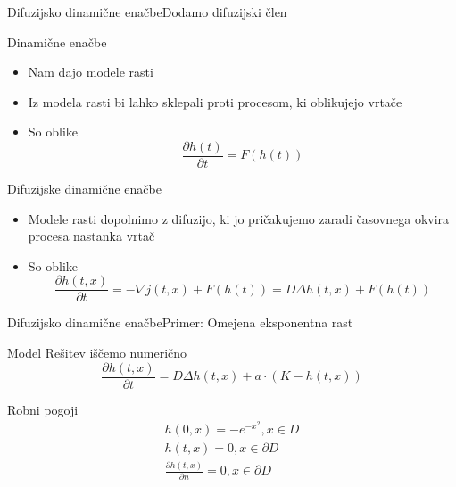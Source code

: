 \documentclass{beamer}
\begin{document}
\begin{frame}{Difuzijsko dinamične enačbe}{Dodamo difuzijski člen}

\begin{block}{Dinamične enačbe}
  \begin{itemize}
  \item
    Nam dajo modele rasti
  \item
    Iz modela rasti bi lahko sklepali proti procesom, ki oblikujejo vrtače
  \item
    So oblike \begin{equation} \frac{\partial h(t)}{\partial t} = F( h(t) ) \end{equation}
  \end{itemize}
\end{block}
\begin{block}{Difuzijske dinamične enačbe}
  \begin{itemize}
  \item
    Modele rasti dopolnimo z difuzijo, ki jo pričakujemo zaradi časovnega okvira procesa nastanka vrtač
  \item
    So oblike \begin{equation}  \frac{ \partial h(t,x) }{ \partial t} = - \nabla j(t,x) + F( h(t) )= D \Delta h(t,x) + F( h(t) ) \end{equation}
  \end{itemize}
\end{block}
\end{frame}


\begin{frame}{Difuzijsko dinamične enačbe}{Primer: Omejena eksponentna rast}
\begin{block}{Model}
  Rešitev iščemo numerično
  \begin{equation} \frac{ \partial h(t,x) }{ \partial t} = D \Delta h(t,x) + a \cdot (K - h(t,x)) \end{equation} 
\end{block}
\begin{block}{Robni pogoji}
        \begin{equation}
          \begin{aligned}
            h(0,x) =  - e^{-x^2}, x \in D \\
            h(t,x) = 0, x \in \partial D \\
            \frac{\partial h(t,x)}{\partial n} = 0, x \in \partial D \\
          \end{aligned}
        \end{equation}
\end{block}
\end{frame}
\end{document}
